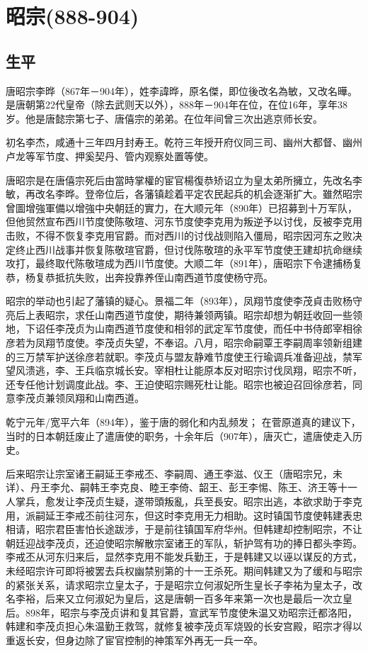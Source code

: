 
\section{昭宗\tiny(888-904)}

\subsection{生平}

唐昭宗李晔（867年－904年），姓李諱晔，原名傑，即位後改名為敏，又改名曄。是唐朝第22代皇帝（除去武则天以外），888年－904年在位，在位16年，享年38岁。他是唐懿宗第七子、唐僖宗的弟弟。在位年间曾三次出逃京师长安。

初名李杰，咸通十三年四月封寿王。乾符三年授开府仪同三司、幽州大都督、幽州卢龙等军节度、押奚契丹、管内观察处置等使。

唐昭宗是在唐僖宗死后由當時掌權的宦官楊復恭矫诏立为皇太弟所擁立，先改名李敏，再改名李晔。登帝位后，各藩镇趁着平定农民起兵的机会逐渐扩大。雖然昭宗曾圖增強軍備以增強中央朝廷的實力，在大顺元年（890年）已招募到十万军队，但他贸然宣布西川节度使陈敬瑄、河东节度使李克用为叛逆予以讨伐，反被李克用击败，不得不恢复李克用官爵。而对西川的讨伐战则陷入僵局，昭宗因河东之败决定终止西川战事并恢复陈敬瑄官爵，但讨伐陈敬瑄的永平军节度使王建却抗命继续攻打，最终取代陈敬瑄成为西川节度使。大顺二年（891年），唐昭宗下令逮捕杨复恭，杨复恭抵抗失败，出奔投靠养侄山南西道节度使杨守亮。

昭宗的举动也引起了藩镇的疑心。景福二年（893年），凤翔节度使李茂貞击败杨守亮后上表昭宗，求任山南西道节度使，期待兼领两镇。昭宗却想为朝廷收回一些领地，下诏任李茂贞为山南西道节度使和相邻的武定军节度使，而任中书侍郎宰相徐彦若为凤翔节度使。李茂贞失望，不奉诏。八月，昭宗命嗣覃王李嗣周率领新组建的三万禁军护送徐彦若就职。李茂贞与盟友静难节度使王行瑜调兵准备迎战，禁军望风溃逃，李、王兵临京城长安。宰相杜让能原本反对昭宗讨伐凤翔，昭宗不听，还专任他计划调度此战。李、王迫使昭宗赐死杜让能。昭宗也被迫召回徐彦若，同意李茂贞兼领凤翔和山南西道。

乾宁元年/宽平六年（894年），鉴于唐的弱化和内乱频发； 在菅原道真的建议下，当时的日本朝廷废止了遣唐使的职务，十余年后（907年），唐灭亡，遣唐使走入历史。

后来昭宗让宗室诸王嗣延王李戒丕、李嗣周、通王李滋、仪王（唐昭宗兄，未详）、丹王李允、嗣韩王李克良、睦王李倚、韶王、彭王李惕、陈王、济王等十一人掌兵，愈发让李茂贞生疑，遂带頭叛亂，兵至長安。昭宗出逃，本欲求助于李克用，派嗣延王李戒丕前往河东，但这时李克用无力相助。这时镇国节度使韩建表忠相请，昭宗君臣害怕长途跋涉，于是前往镇国军府华州。但韩建却控制昭宗，不让朝廷迎战李茂贞，还迫使昭宗解散宗室诸王的军队，斩护驾有功的捧日都头李筠。李戒丕从河东归来后，显然李克用不能发兵勤王，于是韩建又以诬以谋反的方式，未经昭宗许可即将被罢去兵权幽禁别第的十一王杀死。期间韩建又为了缓和与昭宗的紧张关系，请求昭宗立皇太子，于是昭宗立何淑妃所生皇长子李祐为皇太子，改名李裕，后来又立何淑妃为皇后，这是唐朝一百多年来第一次也是最后一次立皇后。898年，昭宗与李茂贞讲和复其官爵，宣武军节度使朱温又劝昭宗迁都洛阳，韩建和李茂贞担心朱温勤王救驾，就修复被李茂贞军烧毁的长安宫殿，昭宗才得以重返长安，但身边除了宦官控制的神策军外再无一兵一卒。

